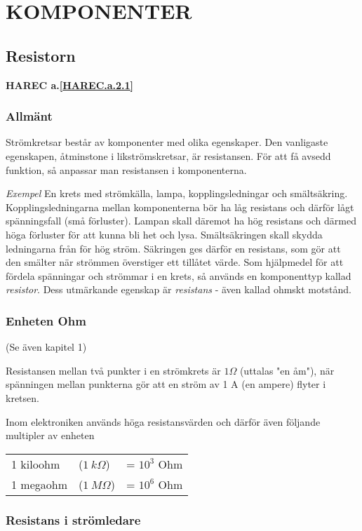 \chapter{KOMPONENTER}

\section{Resistorn}
\textbf{HAREC a.\ref{HAREC.a.2.1}\label{myHAREC.a.2.1}}

\subsection{Allmänt}

Strömkretsar består av komponenter med olika egenskaper.
Den vanligaste egenskapen, åtminstone i likströmskretsar, är resistansen.
För att få avsedd funktion, så anpassar man resistansen i komponenterna.

\emph{Exempel}
En krets med strömkälla, lampa, kopplingsledningar och smältsäkring.
Kopplingsledningarna mellan komponenterna bör ha
låg resistans och därför lågt spänningsfall
(små förluster). Lampan skall däremot ha
hög resistans och därmed höga förluster för
att kunna bli het och lysa. Smältsäkringen
skall skydda ledningarna från för hög ström.
Säkringen ges därför en resistans, som gör
att den smälter när strömmen överstiger ett
tillåtet värde.
Som hjälpmedel för att fördela spänningar
och strömmar i en krets, så används en
komponenttyp kallad \emph{resistor}. Dess utmärkande egenskap är \emph{resistans} - även kallad
ohmskt motstånd.

\subsection{Enheten Ohm}

(Se även kapitel 1)

Resistansen mellan två punkter i en strömkrets är \(1 \Omega\) (uttalas "en åm"),
när spänningen mellan punkterna gör att en ström av 1 A (en ampere) flyter i kretsen.

Inom elektroniken används höga resistansvärden och därför även följande multipler av enheten
\begin{tabular}{lll}
  1 kiloohm & (\(1\ k\Omega\)) & = \(10^3\) Ohm \\
  1 megaohm & (\(1\ M\Omega\)) & = \(10^6\) Ohm \\
\end{tabular}

\subsection{Resistans i strömledare}

